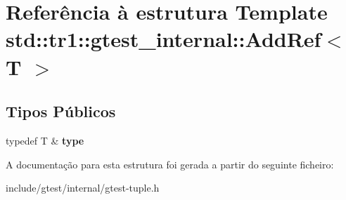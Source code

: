 \hypertarget{structstd_1_1tr1_1_1gtest__internal_1_1AddRef}{\section{Referência à estrutura Template std\-:\-:tr1\-:\-:gtest\-\_\-internal\-:\-:Add\-Ref$<$ T $>$}
\label{structstd_1_1tr1_1_1gtest__internal_1_1AddRef}
}
\subsection*{Tipos Públicos}
\begin{DoxyCompactItemize}
\item 
\hypertarget{structstd_1_1tr1_1_1gtest__internal_1_1AddRef_a1e5616e414125574c1653e3a1fc68491}{typedef T \& {\bfseries type}}\label{structstd_1_1tr1_1_1gtest__internal_1_1AddRef_a1e5616e414125574c1653e3a1fc68491}

\end{DoxyCompactItemize}


A documentação para esta estrutura foi gerada a partir do seguinte ficheiro\-:\begin{DoxyCompactItemize}
\item 
include/gtest/internal/gtest-\/tuple.\-h\end{DoxyCompactItemize}
